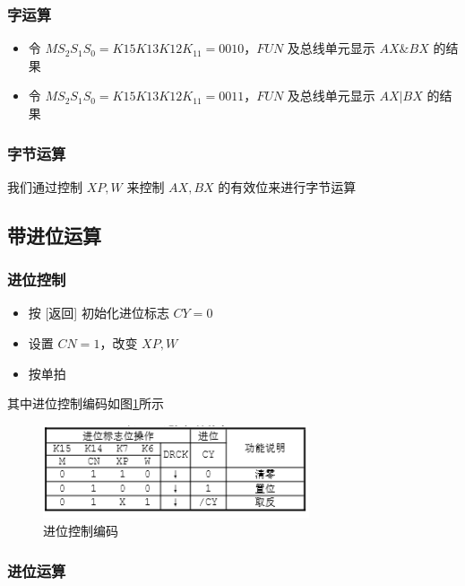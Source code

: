 \documentclass[a4paper,10pt,UTF8]{paper}
\numberwithin{equation}{section}
\numberwithin{figure}{section}
\begin{document}
\subsubsection{字运算}

\begin{itemize}
  \item 令 $MS_2S_1S_0=K{15}K{13}K{12}K_{11}=0010$，$FUN$ 及总线单元显示 $AX \& BX$ 的结果
  \item 令 $MS_2S_1S_0=K{15}K{13}K{12}K_{11}=0011$，$FUN$ 及总线单元显示 $AX | BX$ 的结果
\end{itemize}

\subsubsection{字节运算}

我们通过控制 $XP,W$ 来控制 $AX, BX$ 的有效位来进行字节运算

\subsection{带进位运算}

\subsubsection{进位控制}

\begin{itemize}
  \item 按 [返回] 初始化进位标志 $CY=0$
  \item 设置 $CN=1$，改变 $XP,W$
  \item 按单拍
\end{itemize}

其中进位控制编码如图\ref{fig:cycode}所示


\begin{figure}[h]
  \centering
  \includegraphics[width=0.7\textwidth]{3.PNG}
  \caption{进位控制编码}
  \label{fig:cycode}
\end{figure}

\subsubsection{进位运算}
\end{document}
